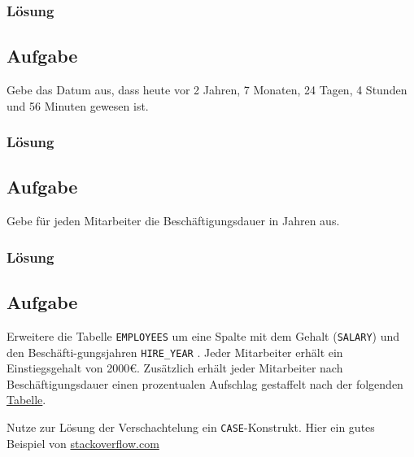 \subsubsection*{Lösung}
\label{sec:uebung_03.aufgabe_09.loesung}

\subsection{Aufgabe}
\label{sec:uebung_03.aufgabe_10}
Gebe das Datum aus, dass heute vor 2 Jahren, 7 Monaten, 24 Tagen, 4 Stunden und 56 Minuten gewesen ist.

\subsubsection*{Lösung}
\label{sec:uebung_03.aufgabe_10.loesung}

\subsection{Aufgabe}
\label{sec:uebung_03.aufgabe_11}
Gebe für jeden Mitarbeiter die Beschäftigungsdauer in Jahren aus.

\subsubsection*{Lösung}
\label{sec:uebung_03.aufgabe_11.loesung}

\subsection{Aufgabe}
\label{sec:uebung_03.aufgabe_12}
Erweitere die Tabelle \texttt{EMPLOYEES} um eine Spalte mit dem Gehalt (\texttt{SALARY}) und den Beschäfti-gungsjahren \texttt{HIRE\_YEAR} . Jeder Mitarbeiter erhält ein Einstiegsgehalt von 2000\euro{}. Zusätzlich erhält jeder Mitarbeiter nach Beschäftigungsdauer einen prozentualen Aufschlag gestaffelt nach der folgenden \hyperref[tbl:uebung_03.aufgabe_12]{Tabelle}.

\begin{info-popup}
  Nutze zur Lösung der Verschachtelung ein \texttt{CASE}-Konstrukt. Hier ein gutes Beispiel von \href{https://stackoverflow.com/a/5171127/7652996}{stackoverflow.com}
\end{info-popup}

